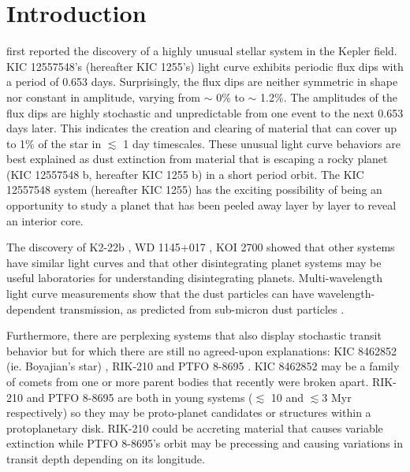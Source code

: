 \documentclass[preprint]{aastex61}
\newcommand{\sha}{KIC 1255 b}
\newcommand{\shStar}{KIC 1255}
\begin{document}
\section{Introduction}
\citet{rappaport} first reported the discovery of a highly unusual stellar system in the Kepler field.
KIC 12557548's (hereafter \shStar's) light curve exhibits periodic flux dips with a period of 0.653 days.
Surprisingly, the flux dips are neither symmetric in shape nor constant in amplitude, varying from $\sim$ 0\% to $\sim$ 1.2\%.
The amplitudes of the flux dips are highly stochastic and unpredictable from one event to the next 0.653 days later.
This indicates the creation and clearing of material that can cover up to 1\% of the star in $\lesssim$ 1 day timescales.
These unusual light curve behaviors are best explained as dust extinction from material that is escaping a rocky planet (KIC 12557548 b, hereafter \sha) in a short period orbit.
The KIC 12557548 system (hereafter \shStar) has the exciting possibility of being an opportunity to study a planet that has been peeled away layer by layer to reveal an interior core.

The discovery of K2-22b \citep{sanchis-ojedak2-22}, WD 1145+017 \citep{vanderburg2015wdDisintegrating}, KOI 2700 \citep{rappaport2014KOI2700} showed that other systems have similar light curves and that other disintegrating planet systems may be useful laboratories for understanding disintegrating planets.
Multi-wavelength light curve measurements show that the dust particles can have wavelength-dependent transmission, as predicted from sub-micron dust particles \citep{bochinski2015evolving,sanchis-ojedak2-22}.

Furthermore, there are perplexing systems that also display stochastic transit behavior but for which there are still no agreed-upon explanations: KIC 8462852 (ie. Boyajian's star) \citep{boyajian846}, RIK-210 \citep{david2017rik210} and PTFO 8-8695 \citep{vanEyken2012ptfTTauri}.
KIC 8462852 may be a family of comets from one or more parent bodies that recently were broken apart.
RIK-210 and PTFO 8-8695 are both in young systems ($\lesssim$ 10 and $\lesssim$3 Myr respectively) so they may be proto-planet candidates or structures within a protoplanetary disk.
RIK-210 could be accreting material that causes variable extinction while PTFO 8-8695's orbit may be precessing and causing variations in transit depth depending on its longitude.
\end{document}
